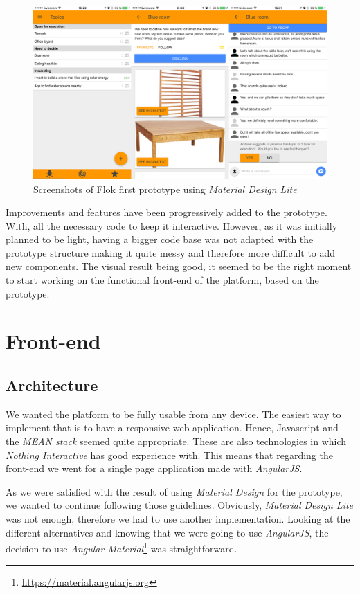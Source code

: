 \documentclass[a4paper,12pt, oneside]{article}
\begin{document}
\begin{figure}[!htb]
\centering
\includegraphics[width=\textwidth]{images/firstPrototypeScreenshots.png}
\caption{Screenshots of Flok first prototype using \emph{Material Design Lite}}
\label{fig.firstPrototypeScreenshots}
\end{figure}

Improvements and features have been progressively added to the prototype.
With, all the necessary code to keep it interactive.
However, as it was initially planned to be light, having a bigger code base was not adapted with the prototype structure making it quite messy and therefore more difficult to add new components.
The visual result being good, it seemed to be the right moment to start working on the functional front-end of the platform, based on the prototype.

\section{Front-end}
\subsection{Architecture}
\label{sec.architecture}
We wanted the platform to be fully usable from any device.
The easiest way to implement that is to have a responsive web application.
Hence, Javascript and the \emph{MEAN stack} seemed quite appropriate.
These are also technologies in which \emph{Nothing Interactive} has good experience with.
This means that regarding the front-end we went for a single page application made with \emph{AngularJS}.

As we were satisfied with the result of using \emph{Material Design} for the prototype, we wanted to continue following those guidelines.
Obviously, \emph{Material Design Lite} was not enough, therefore we had to use another implementation.
Looking at the different alternatives and knowing that we were going to use \emph{AngularJS}, the decision to use \emph{Angular Material}\footnote{\url{https://material.angularjs.org}} was straightforward.
\end{document}
